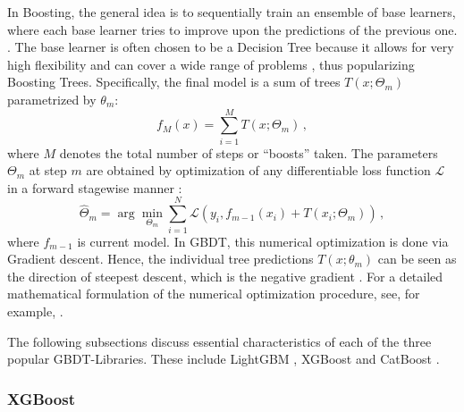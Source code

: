 In Boosting, the general idea is to sequentially train an ensemble of base learners, where each base learner tries to improve upon the predictions of the previous one. \parencite[337]{hastie_elements_2009}. The base learner is often chosen to be a Decision Tree because it allows for very high flexibility and can cover a wide range of problems \parencite[350--352]{hastie_elements_2009}, thus popularizing Boosting Trees. Specifically, the final model is a sum of trees $T(x; \Theta_m)$ parametrized by $\theta_m$:
\begin{equation}
    f_M(x) = \sum_{i = 1}^M T(x; \Theta_m) \, ,
\end{equation}
where $M$ denotes the total number of steps or \enquote{boosts} taken. The parameters $\Theta_m$ at step $m$ are obtained by optimization of any differentiable loss function $\mathcal{L}$ in a forward stagewise manner \parencite[356--357]{hastie_elements_2009}:
\begin{equation}
    \label{eq:GBDT-optimization}
    \hat{\Theta}_m=\arg \min _{\Theta_m} \sum_{i=1}^N \mathcal{L}\left(y_i, f_{m-1}(x_i)+T(x_i ; \Theta_m)\right) \, ,
\end{equation}
where $f_{m-1}$ is current model.
In GBDT, this numerical optimization is done via Gradient descent. Hence, the individual tree predictions $T(x; \theta_m)$ can be seen as the direction of steepest descent, which is the negative gradient \parencite[359]{hastie_elements_2009}. For a detailed mathematical formulation of the numerical optimization procedure, see, for example, \cites[1189--1193]{friedman_greedy_2001}[353--360]{hastie_elements_2009}.

The following subsections discuss essential characteristics of each of the three popular GBDT-Libraries. These include LightGBM \parencite{ke_lightgbm_2017}, XGBoost \parencite{chen_xgboost_2016}  and CatBoost \parencite{prokhorenkova_catboost_2017}.

\subsubsection{XGBoost}


